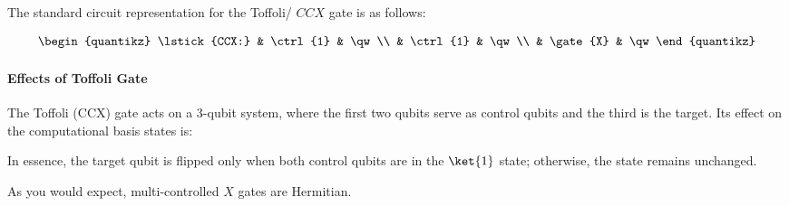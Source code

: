 The standard circuit representation for the Toffoli/ $CCX$ gate is as follows:

\begin{align*}
  \begin{quantikz}
    \lstick{CCX:} & \ctrl{1} & \qw \\
                  & \ctrl{1} & \qw \\
                  & \gate{X} & \qw
  \end{quantikz}
\end{align*}

\paragraph{Effects of Toffoli Gate}\label{par:Effects of Toffoli Gate}

The Toffoli (CCX) gate acts on a 3-qubit system, where the first two qubits
serve as control qubits and the third is the target. Its effect on the
computational basis states is:

\nt{
  \[
    \begin{aligned}
      \text{Toffoli}\,\ket{000} &= \ket{000}  \quad & \text{Toffoli}\,\ket{100} &= \ket{100} \\
      \text{Toffoli}\,\ket{001} &= \ket{001} \quad &       \text{Toffoli}\,\ket{101} &= \ket{101} \\
      \text{Toffoli}\,\ket{010} &= \ket{010} \quad &       \text{Toffoli}\,\ket{110} &= \ket{111} \\
      \text{Toffoli}\,\ket{011} &= \ket{011}  \quad &       \text{Toffoli}\,\ket{111} &= \ket{110}
    \end{aligned}
  \]
}

In essence, the target qubit is flipped only when both control qubits are in
the \(\ket{1}\) state; otherwise, the state remains unchanged.


As you would expect, multi-controlled $X$ gates are Hermitian.

